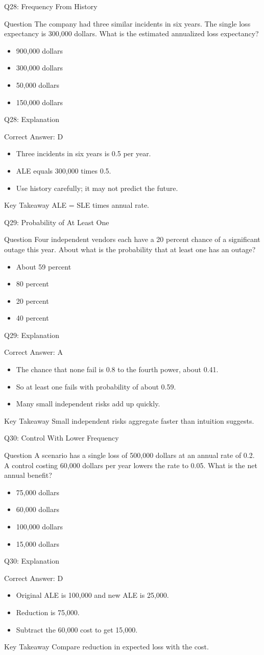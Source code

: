\documentclass[aspectratio=169]{beamer}
\newcommand{\hq}[7]{%
	\begin{frame}{Q#1: #2}
		\begin{block}{Question}
			#3
		\end{block}
		\begin{itemize}
			#4
		\end{itemize}
	\end{frame}
	\begin{frame}{Q#1: Explanation}
		\begin{block}{Correct Answer: #5}
			\begin{itemize}
				#6
			\end{itemize}
		\end{block}
		\begin{alertblock}{Key Takeaway}
			#7
		\end{alertblock}
	\end{frame}
}
\begin{document}
	\hq{28}{Frequency From History}
	{The company had three similar incidents in six years. The single loss expectancy is 300,000 dollars. What is the estimated annualized loss expectancy?}
	{\item[\textbf{(A)}] 900,000 dollars
		\item[\textbf{(B)}] 300,000 dollars
		\item[\textbf{(C)}] 50,000 dollars
		\item[\textbf{(D)}] 150,000 dollars}
	{D}
	{\item Three incidents in six years is 0.5 per year.
		\item ALE equals 300,000 times 0.5.
		\item Use history carefully; it may not predict the future.}
	{ALE = SLE times annual rate.}

	\hq{29}{Probability of At Least One}
	{Four independent vendors each have a 20 percent chance of a significant outage this year. About what is the probability that at least one has an outage?}
	{\item[\textbf{(A)}] About 59 percent
		\item[\textbf{(B)}] 80 percent
		\item[\textbf{(C)}] 20 percent
		\item[\textbf{(D)}] 40 percent}
	{A}
	{\item The chance that none fail is 0.8 to the fourth power, about 0.41.
		\item So at least one fails with probability of about 0.59.
		\item Many small independent risks add up quickly.}
	{Small independent risks aggregate faster than intuition suggests.}

	\hq{30}{Control With Lower Frequency}
	{A scenario has a single loss of 500,000 dollars at an annual rate of 0.2. A control costing 60,000 dollars per year lowers the rate to 0.05. What is the net annual benefit?}
	{\item[\textbf{(A)}] 75,000 dollars
		\item[\textbf{(B)}] 60,000 dollars
		\item[\textbf{(C)}] 100,000 dollars
		\item[\textbf{(D)}] 15,000 dollars}
	{D}
	{\item Original ALE is 100,000 and new ALE is 25,000.
		\item Reduction is 75,000.
		\item Subtract the 60,000 cost to get 15,000.}
	{Compare reduction in expected loss with the cost.}
\end{document}
